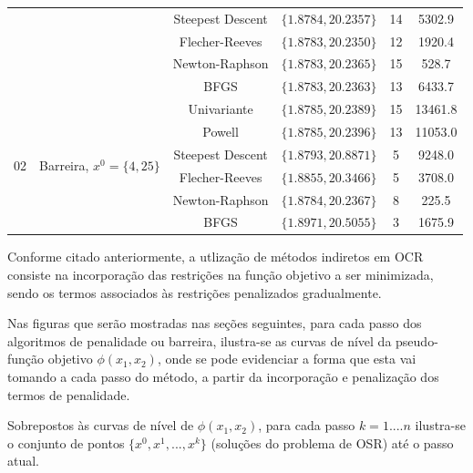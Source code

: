 \documentclass[10pt, a4paper]{article}
\begin{document}
\begin{table}[H]
\begin{tabular}{c|c|c|c|c|c}
                                                            & & Steepest Descent  & $\{1.8784,20.2357\}$ & 14 & 5302.9  \\
                                                            & & Flecher-Reeves    & $\{1.8783,20.2350\}$ & 12 & 1920.4  \\
                                                            & & Newton-Raphson    & $\{1.8783,20.2365\}$ & 15 & 528.7   \\
                                                            & & BFGS              & $\{1.8783,20.2363\}$ & 13 & 6433.7  \\
            \hline
            \multirow{6}{*}{02} & \multirow{6}{*}{Barreira, $x^0=\{4,25\}$} & Univariante         & $\{1.8785,20.2389\}$ & 15 & 13461.8 \\
                                                            & & Powell            & $\{1.8785,20.2396\}$ & 13 & 11053.0 \\
                                                            & & Steepest Descent  & $\{1.8793,20.8871\}$ & 5  & 9248.0  \\
                                                            & & Flecher-Reeves    & $\{1.8855,20.3466\}$ & 5  & 3708.0  \\
                                                            & & Newton-Raphson    & $\{1.8784,20.2367\}$ & 8  & 225.5   \\
                                                            & & BFGS              & $\{1.8971,20.5055\}$ & 3  & 1675.9  \\
            \hline
      \end{tabular}
      \label{table:results}
\end{table}

Conforme citado anteriormente, a utliza\c c\~ao de m\'etodos indiretos em OCR consiste na incorpora\c c\~ao das restri\c c\~oes na fun\c c\~ao objetivo a ser minimizada, sendo os termos associados \`as restri\c c\~oes penalizados gradualmente.

Nas figuras que ser\~ao mostradas nas se\c c\~oes seguintes, para cada passo dos algoritmos de penalidade ou barreira, ilustra-se as curvas de n\'ivel da pseudo-fun\c c\~ao objetivo $\phi(x_1, x_2)$, onde se pode evidenciar a forma que esta vai tomando a cada passo do m\'etodo, a partir da incorpora\c c\~ao e penaliza\c c\~ao dos termos de penalidade.

Sobrepostos \`as curvas de n\'ivel de $\phi(x_1, x_2)$, para cada passo $k=1....n$ ilustra-se o conjunto de pontos $\{x^0, x^1, ... , x^k\}$ (solu\c c\~oes do problema de OSR) at\'e o passo atual.
\end{document}
